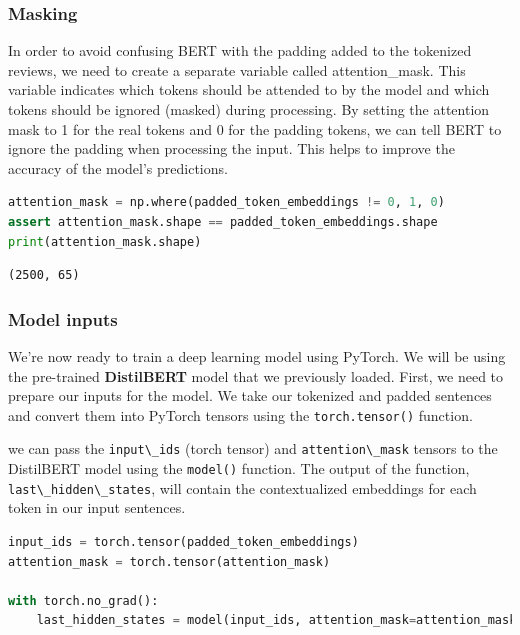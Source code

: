 \subsubsection{Masking}\label{masking}

In order to avoid confusing BERT with the padding added to the tokenized
reviews, we need to create a separate variable called attention\_mask.
This variable indicates which tokens should be attended to by the model
and which tokens should be ignored (masked) during processing. By
setting the attention mask to 1 for the real tokens and 0 for the
padding tokens, we can tell BERT to ignore the padding when processing
the input. This helps to improve the accuracy of the model's
predictions.

\begin{lstlisting}[language=Python]
attention_mask = np.where(padded_token_embeddings != 0, 1, 0)
assert attention_mask.shape == padded_token_embeddings.shape
print(attention_mask.shape)
\end{lstlisting}

\begin{lstlisting}
(2500, 65)
\end{lstlisting}

\subsubsection{Model inputs}\label{model-inputs}

We're now ready to train a deep learning model using PyTorch. We will be
using the pre-trained \textbf{DistilBERT} model that we previously
loaded. First, we need to prepare our inputs for the model. We take our
tokenized and padded sentences and convert them into PyTorch tensors
using the \lstinline{torch.tensor()} function.

we can pass the \lstinline{input\_ids} (torch tensor) and
\lstinline{attention\_mask} tensors to the DistilBERT
model using the \lstinline{model()} function. The output
of the function, \lstinline{last\_hidden\_states}, will
contain the contextualized embeddings for each token in our input
sentences.

\begin{lstlisting}[language=Python]
input_ids = torch.tensor(padded_token_embeddings)
attention_mask = torch.tensor(attention_mask)

with torch.no_grad():
    last_hidden_states = model(input_ids, attention_mask=attention_mask)
\end{lstlisting}

